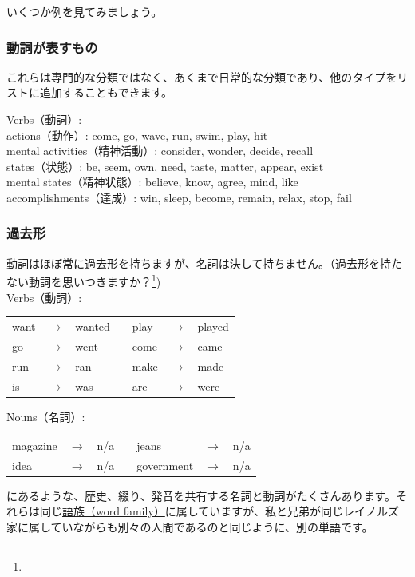 いくつか例を見てみましょう。

\subsubsection*{動詞が表すもの}
これらは専門的な分類ではなく、あくまで日常的な分類であり、他のタイプをリストに追加することもできます。

\ea Verbs（動詞）:\\
    actions（動作）: come, go, wave, run, swim, play, hit\\
    mental activities（精神活動）: consider, wonder, decide, recall\\
    states（状態）: be, seem, own, need, taste, matter, appear, exist\\
    mental states（精神状態）: believe, know, agree, mind, like\\
    accomplishments（達成）: win, sleep, become, remain, relax, stop, fail
\z

\subsubsection*{過去形}\label{sec:past-forms}
動詞はほぼ常に過去形を持ちますが、名詞は決して持ちません。（過去形を持たない動詞を思いつきますか？\footnote{})\\

\ea\label{ex:past-tense-forms-verbs-vs-nouns}
    \ea Verbs（動詞）:\\
    \begin{tabular}{@{} l l l l l l l}
    want & $\rightarrow$ & wanted && play & $\rightarrow$ & played \\
    go & $\rightarrow$ & went && come & $\rightarrow$ & came \\
    run & $\rightarrow$ & ran && make & $\rightarrow$ & made \\
    is & $\rightarrow$ & was && are & $\rightarrow$ & were \\
    \end{tabular}
    \ex Nouns（名詞）:\\
    \begin{tabular}{@{} l l l l l l l}
    magazine & $\rightarrow$ & n/a && jeans & $\rightarrow$ & n/a \\
    idea & $\rightarrow$ & n/a && government & $\rightarrow$ & n/a \\
    \end{tabular}
\z
\z
{} にあるような、歴史、綴り、発音を共有する名詞と動詞がたくさんあります。それらは同じ\hyperref[sec:family-lemma-shape-token]{語族（word family）}に属していますが、私と兄弟が同じレイノルズ家に属していながらも別々の人間であるのと同じように、別の単語です。



